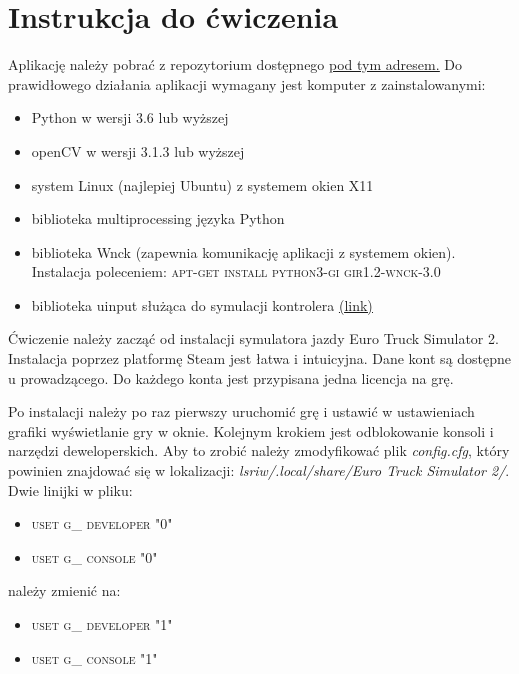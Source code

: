 \chapter{Instrukcja do ćwiczenia}


Aplikację należy pobrać z repozytorium dostępnego
\href{https://github.com/jaroslaw-b/ETS2_test_environment}{\underline{pod tym adresem.}}
Do prawidłowego działania aplikacji wymagany jest komputer z zainstalowanymi:
\begin{itemize}
\item Python w wersji 3.6 lub wyższej
\item openCV w wersji 3.1.3 lub wyższej
\item system Linux (najlepiej Ubuntu) z systemem okien X11
\item biblioteka multiprocessing języka Python
\item biblioteka Wnck (zapewnia komunikację aplikacji z systemem okien). Instalacja poleceniem: \textsc{apt-get install python3-gi gir1.2-wnck-3.0}
\item biblioteka uinput służąca do symulacji kontrolera \href{https://github.com/tuomasjjrasanen/python-uinput}{(\underline{link)}}
\end{itemize}

Ćwiczenie należy zacząć od instalacji symulatora jazdy Euro Truck Simulator 2. Instalacja poprzez platformę Steam jest łatwa i intuicyjna. Dane kont są dostępne u prowadzącego. Do każdego konta jest przypisana jedna licencja na grę.

Po instalacji należy po raz pierwszy uruchomić grę i ustawić w ustawieniach grafiki wyświetlanie gry w oknie.
Kolejnym krokiem jest odblokowanie konsoli i narzędzi deweloperskich. Aby to zrobić należy zmodyfikować plik \textit{config.cfg}, który powinien znajdować się w lokalizacji: \textit{lsriw/.local/share/Euro Truck Simulator 2/}. Dwie linijki w pliku:
\begin{itemize}
\item \textsc{uset g\_ developer "0"}
\item \textsc{uset g\_ console "0"}
\end{itemize}

należy zmienić na:

\begin{itemize}
\item \textsc{uset g\_ developer "1"}
\item \textsc{uset g\_ console "1"}
\end{itemize}

